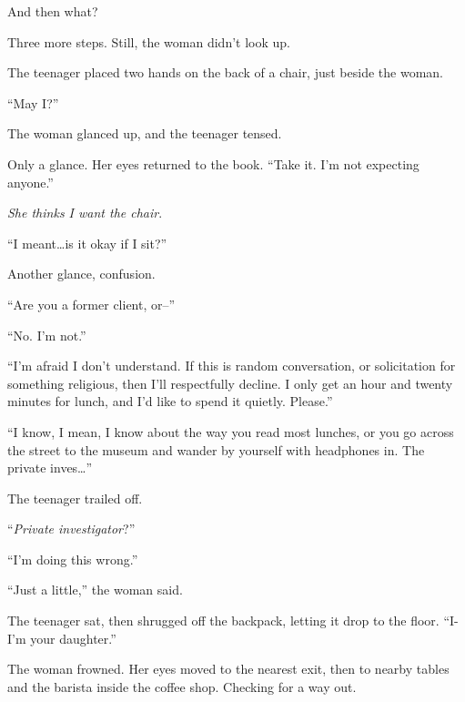 And then what?



Three more steps.  Still, the woman didn't look up.



The teenager placed two hands on the back of a chair, just beside the woman.



``May I?''



The woman glanced up, and the teenager tensed.



Only a glance.  Her eyes returned to the book.  ``Take it.  I'm not expecting anyone.''



\emph{She thinks I want the chair}.



``I meant\ldots is it okay if I sit?''



Another glance, confusion.



``Are you a former client, or--''



``No.  I'm not.''



``I'm afraid I don't understand.  If this is random conversation, or solicitation for something religious, then I'll respectfully decline.  I only get an hour and twenty minutes for lunch, and I'd like to spend it quietly.  Please.''



``I know, I mean, I know about the way you read most lunches, or you go across the street to the museum and wander by yourself with headphones in.  The private inves\ldots''



The teenager trailed off.



``\emph{Private investigator}?''



``I'm doing this wrong.''



``Just a little,'' the woman said.



The teenager sat, then shrugged off the backpack, letting it drop to the floor.  ``I- I'm your daughter.''



The woman frowned.  Her eyes moved to the nearest exit, then to nearby tables and the barista inside the coffee shop.  Checking for a way out.



